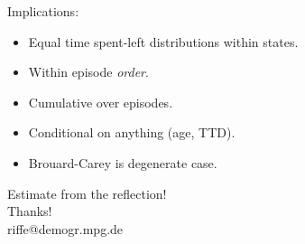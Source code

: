 \documentclass[20pt,usenames,dvipsnames]{beamer}
\begin{document}
\begin{frame}[plain]
\Large
\begin{center}
Implications:
\pause
\begin{itemize}[<+->]
  \item Equal time spent-left distributions within states.
  \item Within episode \emph{order}. 
  \item Cumulative over episodes.
  \item Conditional on anything (age, TTD).
  \item Brouard-Carey is degenerate case.
\end{itemize}
\end{center}
\end{frame}
%
%

{
\begin{frame}
\vspace{9cm}
\Large
\begin{center}
Estimate from the reflection!\\ Thanks! \\
riffe@demogr.mpg.de
\end{center}
\end{frame}
}

\end{document}

